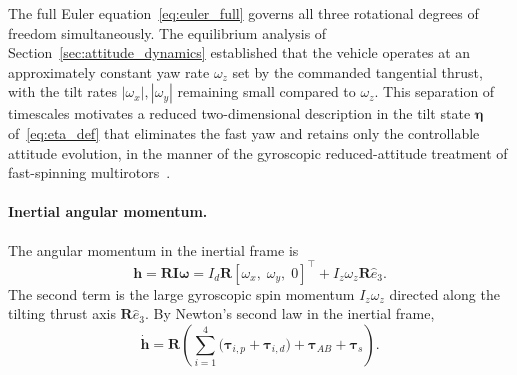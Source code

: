 The full Euler equation~\eqref{eq:euler_full} governs all three rotational
degrees of freedom simultaneously.  The equilibrium analysis of
Section~\ref{sec:attitude_dynamics} established that the vehicle operates at
an approximately constant yaw rate $\omega_z$ set by the commanded tangential
thrust, with the tilt rates $|\omega_x|, |\omega_y|$ remaining small compared
to $\omega_z$.  This separation of timescales motivates a reduced
two-dimensional description in the tilt state $\boldsymbol{\eta}$
of~\eqref{eq:eta_def} that eliminates the fast yaw and retains only the
controllable attitude evolution, in the manner of the gyroscopic
reduced-attitude treatment of fast-spinning
multirotors~\cite{bai2022splitflyerair,mueller2016relaxed}.

\paragraph{Inertial angular momentum.}
The angular momentum in the inertial frame is
\begin{equation}
    \mathbf{h} = \boldsymbol{R}\boldsymbol{I}\boldsymbol{\omega}
        = I_d\boldsymbol{R}[\omega_x,\;\omega_y,\;0]^{\top}
          + I_z\omega_z\boldsymbol{R}\hat{e}_3.
    \label{eq:inertial_h}
\end{equation}
The second term is the large gyroscopic spin momentum $I_z\omega_z$
directed along the tilting thrust axis $\boldsymbol{R}\hat{e}_3$.
By Newton's second law in the inertial frame,
\begin{equation}
    \dot{\mathbf{h}}
        = \boldsymbol{R}\!\left(
            \sum_{i=1}^{4}\bigl(\boldsymbol{\tau}_{i,p}
                               + \boldsymbol{\tau}_{i,d}\bigr)
            + \boldsymbol{\tau}_{AB}
            + \boldsymbol{\tau}_s
          \right).
    \label{eq:h_dot}
\end{equation}


